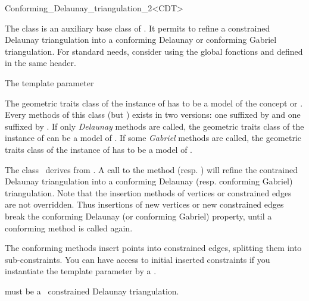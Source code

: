 \begin{ccRefClass}{Conforming_Delaunay_triangulation_2<CDT>}

The class \ccRefName{} is an auxiliary base class of
. It permits to refine a constrained
Delaunay triangulation into a conforming Delaunay or conforming
Gabriel triangulation. For standard needs, consider using the global
fonctions  and
 defined in the same header.

\ccParameters 

The template parameter  \meshcdtrequires{}

The geometric traits class of the instance of  has to be
  a model of the concept 
  or . Every methods of
  this class (but ) exists in two versions: one suffixed
  by  and one suffixed by . If only
  \emph{Delaunay} methods are called, the geometric traits class of
  the instance of  can be a model of
  . If some
  \emph{Gabriel} methods are called, the geometric traits class of
  the instance of  has to be a model of
  .


The class \ccRefName\ derives from . A call to the
  method  (resp.
  ) will refine the contrained Delaunay
  triangulation into a conforming Delaunay (resp. conforming Gabriel)
  triangulation. Note that the insertion methods of vertices or
  constrained edges are not overridden. Thus insertions of new vertices
  or new constrained edges break the conforming Delaunay (or
  conforming Gabriel) property, until a conforming method is called
  again.

The conforming methods insert points into constrained edges, splitting
them into sub-constraints. You can have access to initial inserted
constraints if you instantiate the template parameter by a
.


\ccInheritsFrom


\ccParameters

 must be a \cgal\ constrained Delaunay triangulation.


\end{ccRefClass}
